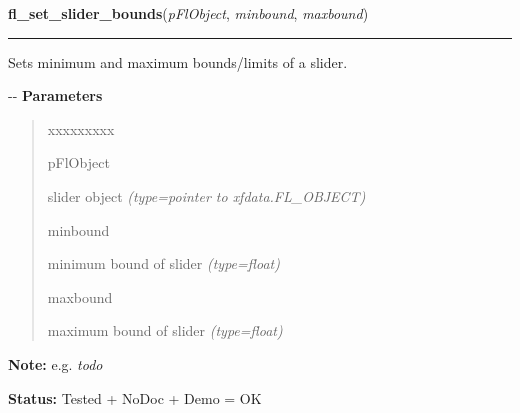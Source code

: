 \hspace{.8\funcindent}\begin{boxedminipage}{\funcwidth}

    \raggedright \textbf{fl\_set\_slider\_bounds}(\textit{pFlObject}, \textit{minbound}, \textit{maxbound})

    \vspace{-1.5ex}

    \rule{\textwidth}{0.5\fboxrule}
\setlength{\parskip}{2ex}

Sets minimum and maximum bounds/limits of a slider.

-{}-
\setlength{\parskip}{1ex}
      \textbf{Parameters}
      \vspace{-1ex}

      \begin{quote}
        \begin{Ventry}{xxxxxxxxx}

          \item[pFlObject]


slider object
            {\it (type=pointer to xfdata.FL\_OBJECT)}

          \item[minbound]


minimum bound of slider
            {\it (type=float)}

          \item[maxbound]


maximum bound of slider
            {\it (type=float)}

        \end{Ventry}

      \end{quote}

\textbf{Note:} 
e.g. \emph{todo}


\textbf{Status:} 
Tested + NoDoc + Demo = OK


    \end{boxedminipage}

    \label{xformslib:flslider:fl_get_slider_bounds}

    \vspace{0.5ex}

